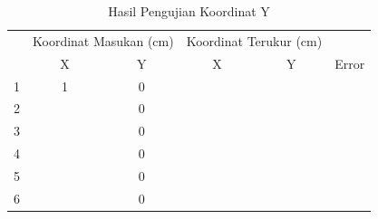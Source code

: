  \begin{table}[]
 	\centering
 	\caption{Hasil Pengujian Koordinat Y}
 	\label{tbl.koordinaty}
 	\begin{tabular}{|c|c|c|c|c|c|}
 		\hline
 		\rowcolor[HTML]{9B9B9B} 
 		\cellcolor[HTML]{9B9B9B}                     & \multicolumn{2}{c|}{\cellcolor[HTML]{9B9B9B}Koordinat Masukan (cm)} & \multicolumn{2}{c|}{\cellcolor[HTML]{9B9B9B}Koordinat Terukur (cm)} & \cellcolor[HTML]{9B9B9B}                            \\ \cline{2-5}
 		\rowcolor[HTML]{9B9B9B} 
 		\multirow{-2}{*}{\cellcolor[HTML]{9B9B9B}No} & X                                & Y                                & X                                & Y                                & \multirow{-2}{*}{\cellcolor[HTML]{9B9B9B}Error} \\ \hline
 		1                                            & 1                                & 0                                &                                  &                                  &                                                     \\ \hline
 		2                                            &                                  & 0                                &                                  &                                  &                                                     \\ \hline
 		3                                            &                                  & 0                                &                                  &                                  &                                                     \\ \hline
 		4                                            &                                  & 0                                &                                  &                                  &                                                     \\ \hline
 		5                                            &                                  & 0                                &                                  &                                  &                                                     \\ \hline
 		6                                            &                                  & 0                                &                                  &                                  &                                                     \\ \hline

\end{tabular}
\end{table}
